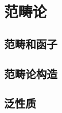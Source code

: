 \documentclass[../main.tex]{subfiles}
\begin{document}
\setcounter{chapter}{1}
\chapter{范畴论}\label{cha:category_theory}
\section{范畴和函子}
\section{范畴论构造}
\section{泛性质}
\end{document}
